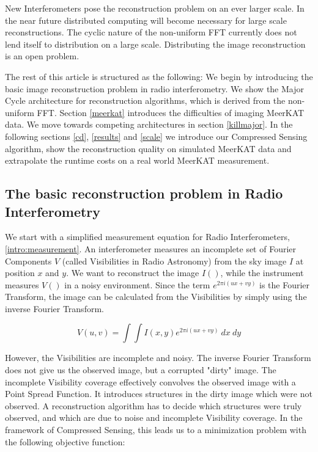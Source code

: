 New Interferometers pose the reconstruction problem on an ever larger scale. In the near future distributed computing will become necessary for large scale reconstructions. The cyclic nature of the non-uniform FFT currently does not lend itself to distribution on a large scale. Distributing the image reconstruction is an open problem.

The rest of this article is structured as the following: We begin by introducing the basic image reconstruction problem in radio interferometry. We show the Major Cycle architecture for reconstruction algorithms, which is derived from the non-uniform FFT.  Section \ref{meerkat} introduces the difficulties of imaging MeerKAT data. We  move towards competing architectures in section \ref{killmajor}. In the following sections \ref{cd}, \ref{results} and \ref{scale} we introduce our Compressed Sensing algorithm, show the reconstruction quality on simulated MeerKAT data and extrapolate the runtime costs on a real world MeerKAT measurement.

\subsection{The basic reconstruction problem in Radio Interferometry}\label{intro:basic}
We start with a simplified measurement equation for Radio Interferometers, \eqref{intro:measurement}. An interferometer measures an incomplete set of Fourier Components $V$ (called Visibilities in Radio Astronomy) from the sky image $I$ at position $x$ and $y$. We want to reconstruct the image $I()$, while the instrument measures $V()$ in a noisy environment. Since the term $e^{2 \pi i (ux+vy)}$ is the Fourier Transform, the image can be calculated from the Visibilities by simply using the inverse Fourier Transform.

\begin{equation}\label{intro:measurement}
V(u, v) = \int\int I(x, y) e^{2 \pi i (ux+vy)} \: dx \: dy
\end{equation}

However, the Visibilities are incomplete and noisy. The inverse Fourier Transform does not give us the observed image, but a corrupted "dirty" image. The incomplete Visibility coverage effectively convolves the observed image with a Point Spread Function. It introduces structures in the dirty image which were not observed. A reconstruction algorithm has to decide which structures were truly observed, and which are due to noise and incomplete Visibility coverage. In the framework of Compressed Sensing, this leads us to a minimization problem with the following objective function:

